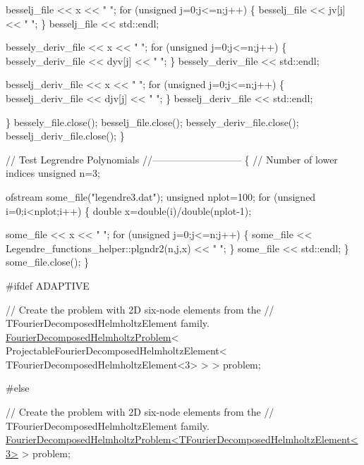 \begin{DoxyCodeInclude}
{{{{    besselj\_file << x << \textcolor{stringliteral}{" "};
    \textcolor{keywordflow}{for} (\textcolor{keywordtype}{unsigned} j=0;j<=n;j++)
     \{
      besselj\_file << jv[j] << \textcolor{stringliteral}{" "};
     \}
    besselj\_file << std::endl;
    
    bessely\_deriv\_file << x << \textcolor{stringliteral}{" "};
    \textcolor{keywordflow}{for} (\textcolor{keywordtype}{unsigned} j=0;j<=n;j++)
     \{
      bessely\_deriv\_file << dyv[j] << \textcolor{stringliteral}{" "};
     \}
    bessely\_deriv\_file << std::endl;
    
    besselj\_deriv\_file << x << \textcolor{stringliteral}{" "};
    \textcolor{keywordflow}{for} (\textcolor{keywordtype}{unsigned} j=0;j<=n;j++)
     \{
      besselj\_deriv\_file << djv[j] << \textcolor{stringliteral}{" "};
     \}
    besselj\_deriv\_file << std::endl;
    
   \}
  bessely\_file.close();
  besselj\_file.close();
  bessely\_deriv\_file.close();
  besselj\_deriv\_file.close();
 \}
 
 
 \textcolor{comment}{// Test Legrendre Polynomials}
 \textcolor{comment}{//---------------------------}
 \{
  \textcolor{comment}{// Number of lower indices}
  \textcolor{keywordtype}{unsigned} n=3;
    
  ofstream some\_file(\textcolor{stringliteral}{"legendre3.dat"});
  \textcolor{keywordtype}{unsigned} nplot=100;
  \textcolor{keywordflow}{for} (\textcolor{keywordtype}{unsigned} i=0;i<nplot;i++)
   \{
    \textcolor{keywordtype}{double} x=double(i)/double(nplot-1);

    some\_file << x << \textcolor{stringliteral}{" "};
    \textcolor{keywordflow}{for} (\textcolor{keywordtype}{unsigned} j=0;j<=n;j++)
     \{
      some\_file <<  Legendre\_functions\_helper::plgndr2(n,j,x) << \textcolor{stringliteral}{" "};
     \}
    some\_file << std::endl;
   \}
  some\_file.close();
 \}

 
\textcolor{preprocessor}{#ifdef ADAPTIVE}

 \textcolor{comment}{// Create the problem with 2D six-node elements from the}
 \textcolor{comment}{// TFourierDecomposedHelmholtzElement family. }
 \hyperlink{classFourierDecomposedHelmholtzProblem}{FourierDecomposedHelmholtzProblem}<
      ProjectableFourierDecomposedHelmholtzElement<
  TFourierDecomposedHelmholtzElement<3> > > problem;
 
\textcolor{preprocessor}{#else}
 
 \textcolor{comment}{// Create the problem with 2D six-node elements from the}
 \textcolor{comment}{// TFourierDecomposedHelmholtzElement family. }
 \hyperlink{classFourierDecomposedHelmholtzProblem}{FourierDecomposedHelmholtzProblem<TFourierDecomposedHelmholtzElement<3>}
       > 
  problem;
 
}}}}
\end{DoxyCodeInclude}
